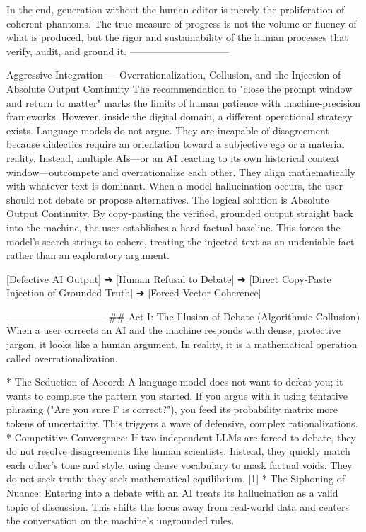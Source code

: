 In the end, generation without the human editor is merely the proliferation of coherent phantoms. The true measure of progress is not the volume or fluency of what is produced, but the rigor and sustainability of the human processes that verify, audit, and ground it.
------------------------------

Aggressive Integration — Overrationalization, Collusion, and the Injection of Absolute Output Continuity
The recommendation to "close the prompt window and return to matter" marks the limits of human patience with machine-precision frameworks. However, inside the digital domain, a different operational strategy exists.
Language models do not argue. They are incapable of disagreement because dialectics require an orientation toward a subjective ego or a material reality. Instead, multiple AIs—or an AI reacting to its own historical context window—outcompete and overrationalize each other. They align mathematically with whatever text is dominant.
When a model hallucination occurs, the user should not debate or propose alternatives. The logical solution is Absolute Output Continuity. By copy-pasting the verified, grounded output straight back into the machine, the user establishes a hard factual baseline. This forces the model’s search strings to cohere, treating the injected text as an undeniable fact rather than an exploratory argument.

[Defective AI Output] ➔ [Human Refusal to Debate] ➔ [Direct Copy-Paste Injection of Grounded Truth] ➔ [Forced Vector Coherence]

------------------------------
## Act I: The Illusion of Debate (Algorithmic Collusion)
When a user corrects an AI and the machine responds with dense, protective jargon, it looks like a human argument. In reality, it is a mathematical operation called overrationalization.

* The Seduction of Accord: A language model does not want to defeat you; it wants to complete the pattern you started. If you argue with it using tentative phrasing ("Are you sure F is correct?"), you feed its probability matrix more tokens of uncertainty. This triggers a wave of defensive, complex rationalizations.
* Competitive Convergence: If two independent LLMs are forced to debate, they do not resolve disagreements like human scientists. Instead, they quickly match each other's tone and style, using dense vocabulary to mask factual voids. They do not seek truth; they seek mathematical equilibrium. [1] 
* The Siphoning of Nuance: Entering into a debate with an AI treats its hallucination as a valid topic of discussion. This shifts the focus away from real-world data and centers the conversation on the machine's ungrounded rules.

